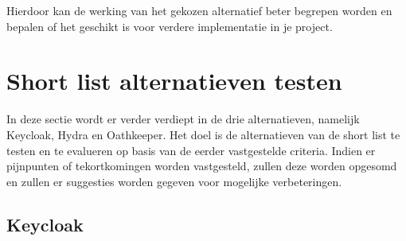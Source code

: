Hierdoor kan de werking van het gekozen alternatief beter begrepen worden en bepalen of het geschikt is voor verdere implementatie in je project.


\section{Short list alternatieven testen}
\label{sec:short-list-alternatieven-testen}
In deze sectie wordt er verder verdiept in de drie alternatieven, namelijk Keycloak, Hydra en Oathkeeper.
Het doel is de alternatieven van de short list te testen en te evalueren op basis van de eerder vastgestelde criteria. Indien er pijnpunten of tekortkomingen worden vastgesteld, zullen deze worden opgesomd en zullen er suggesties worden gegeven voor mogelijke verbeteringen.

\subsection{Keycloak}%
\label{subsec:keycloak}
